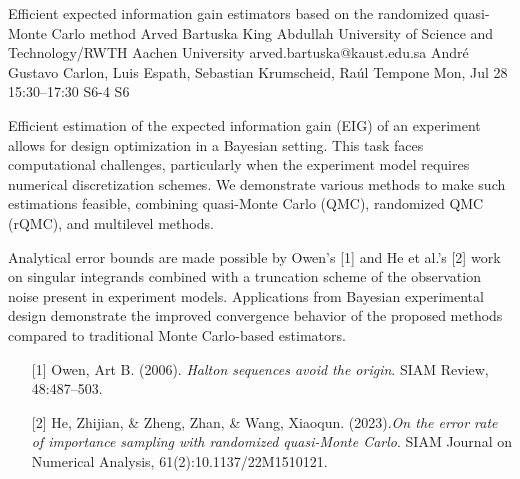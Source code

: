\begin{talk}
  {Efficient expected information gain estimators based on the randomized quasi-Monte Carlo method}%
  {Arved Bartuska}%
  {King Abdullah University of Science and Technology/RWTH Aachen University}%
  {arved.bartuska@kaust.edu.sa}%
  {Andr\'{e} Gustavo Carlon, Luis Espath, Sebastian Krumscheid, Ra\'{u}l Tempone}%
  {}%
  {Mon, Jul 28 15:30–17:30}%
  {S6-4}%
  {S6}%
  
				
			
Efficient estimation of the expected information gain (EIG) of an experiment allows for design optimization in a Bayesian setting. This task faces computational challenges, particularly when the experiment model requires numerical discretization schemes. We demonstrate various methods to make such estimations feasible, combining quasi-Monte Carlo (QMC), randomized QMC (rQMC), and multilevel methods.

Analytical error bounds are made possible by Owen's [1] and He et al.'s [2] work on singular integrands combined with a truncation scheme of the observation noise present in experiment models. Applications from Bayesian experimental design demonstrate the improved convergence behavior of the proposed methods compared to traditional Monte Carlo-based estimators.

\medskip

\begin{enumerate}
	\item[{[1]}] Owen, Art B. (2006). {\it Halton sequences avoid the origin}. SIAM Review, 48:487–503.
	\item[{[2]}] He, Zhijian, \& Zheng, Zhan, \& Wang, Xiaoqun. (2023).{\it On the error rate of importance sampling with randomized quasi-Monte Carlo}. SIAM Journal
on Numerical Analysis,  61(2):10.1137/22M1510121.
\end{enumerate}

\end{talk}

